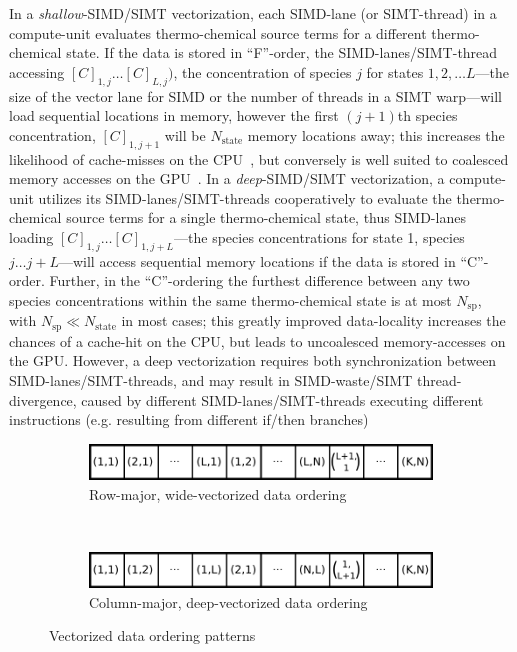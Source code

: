 \documentclass[12pt,number,sort&compress]{elsarticle}
\begin{document}
In a \textit{shallow}-SIMD\slash SIMT vectorization, each SIMD-lane (or SIMT-thread) in a compute-unit evaluates thermo-chemical source terms for a different thermo-chemical state.
If the data is stored in ``F''-order, the SIMD-lanes\slash SIMT-thread accessing $[C]_{1, j}\ldots[C]_{L, j})$, the concentration of species $j$ for states $1, 2,\ldots L$---the size of the vector lane for SIMD or the number of threads in a SIMT warp---will load sequential locations in memory, however the first $(j+1)$th species concentration, $[C]_{1, j+1}$ will be $N_{\text{state}}$ memory locations away; this increases the likelihood of cache-misses on the CPU~\cite{gray2000rules}, but conversely is well suited to coalesced memory accesses on the GPU~\cite{NVIDIA:2018}.
In a \textit{deep}-SIMD\slash SIMT vectorization, a compute-unit utilizes its SIMD-lanes\slash SIMT-threads cooperatively to evaluate the thermo-chemical source terms for a single thermo-chemical state, thus SIMD-lanes loading $[C]_{1, j} \ldots [C]_{1, j + L}$---the species concentrations for state 1, species $j \ldots j + L$---will access sequential memory locations if the data is stored in ``C''-order.
Further, in the ``C''-ordering the furthest difference between any two species concentrations within the same thermo-chemical state is at most $N_{\text{sp}}$, with $N_{\text{sp}} \ll N_{\text{state}}$ in most cases; this greatly improved data-locality increases the chances of a cache-hit on the CPU, but leads to uncoalesced memory-accesses on the GPU.
However, a deep vectorization requires both synchronization between SIMD-lanes\slash SIMT-threads, and may result in SIMD-waste\slash SIMT thread-divergence, caused by different SIMD-lanes\slash SIMT-threads executing different instructions (e.g. resulting from different if\slash then branches)

\begin{figure}[htb]
  \centering
  \begin{minipage}{\linewidth}
    \begin{subfigure}[t]{\textwidth}
	\includegraphics[width=\textwidth]{row_major_split.pdf}
	\caption{Row-major, wide-vectorized data ordering}
	\label{F:row_major_split}
    \end{subfigure}
    \\
    \begin{subfigure}[t]{\textwidth}
	\includegraphics[width=\textwidth]{column_major_split.pdf}
	\caption{Column-major, deep-vectorized data ordering}
	\label{F:column_major_split}
    \end{subfigure}
  \end{minipage}
  \caption{Vectorized data ordering patterns}
  \label{F:vector_data}
\end{figure}
\end{document}
